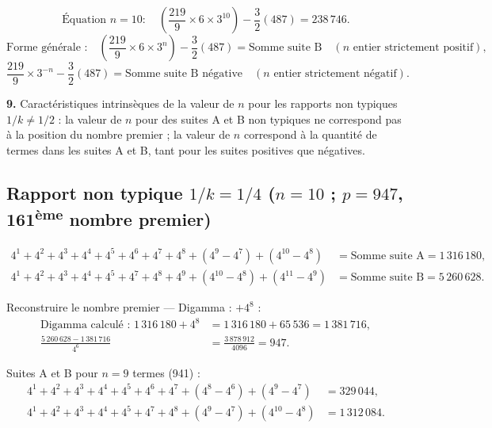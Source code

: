 \documentclass[11pt,a4paper]{article}
\begin{document}
\begin{boitenote}
\begin{boitenote}[Inspiration]
\begin{boitenote}
\vspace{0.3cm}
\begin{boiteformule}
\[
\text{Équation } n=10 :\quad \left(\frac{219}{9}\times 6 \times 3^{10}\right) - \frac{3}{2}(487) = 238\,746.
\]
\[
\text{Forme générale :}\quad \left(\frac{219}{9}\times 6 \times 3^{n}\right) - \frac{3}{2}(487) = \text{Somme suite B}
\quad (n \text{ entier strictement positif}),
\]
\[
\frac{219}{9}\times 3^{-n} - \frac{3}{2}(487) = \text{Somme suite B négative}
\quad (n \text{ entier strictement négatif}).
\]
\end{boiteformule}

\textbf{9.} Caractéristiques intrinsèques de la valeur de $n$ pour les rapports
non typiques $1/k \neq 1/2$ : la valeur de $n$ pour des suites A et B non
typiques ne correspond pas à la position du nombre premier ; la valeur de $n$
correspond à la quantité de termes dans les suites A et B, tant pour les suites
positives que négatives.

\subsection{Rapport non typique $1/k = 1/4$ ($n = 10$ ; $p = 947$, 161\textsuperscript{ème} nombre premier)}

\vspace{0.3cm}
\begin{boiteformule}[Sommes des suites A et B --- rapport $1/4$, $n = 10$]
\begin{align*}
4^{1}+4^{2}+4^{3}+4^{4}+4^{5}+4^{6}+4^{7}+4^{8}+(4^{9}-4^{7})+(4^{10}-4^{8})
  &= \text{Somme suite A} = 1\,316\,180,\\
4^{1}+4^{2}+4^{3}+4^{4}+4^{5}+4^{7}+4^{8}+4^{9}+(4^{10}-4^{8})+(4^{11}-4^{9})
  &= \text{Somme suite B} = 5\,260\,628.
\end{align*}
\end{boiteformule}

Reconstruire le nombre premier --- Digamma : $+4^{8}$ :
\begin{align*}
\text{Digamma calculé : }1\,316\,180+4^{8}
&=1\,316\,180+65\,536=1\,381\,716,\\
\frac{5\,260\,628-1\,381\,716}{4^{6}}
&=\frac{3\,878\,912}{4096}=947.
\end{align*}

Suites A et B pour $n = 9$ termes (941) :
\begin{align*}
4^{1}+4^{2}+4^{3}+4^{4}+4^{5}+4^{6}+4^{7}+(4^{8}-4^{6})+(4^{9}-4^{7}) &= 329\,044,\\
4^{1}+4^{2}+4^{3}+4^{4}+4^{5}+4^{7}+4^{8}+(4^{9}-4^{7})+(4^{10}-4^{8}) &= 1\,312\,084.
\end{align*}


\end{boitenote}
\end{boitenote}
\end{boitenote}
\end{document}
